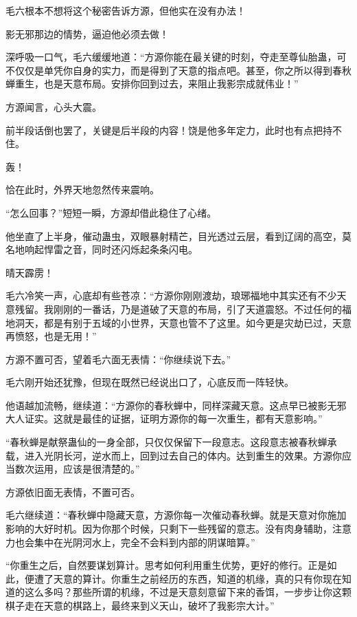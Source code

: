 
\begin{this_body}



毛六根本不想将这个秘密告诉方源，但他实在没有办法！

影无邪那边的情势，逼迫他必须去做！

深呼吸一口气，毛六缓缓地道：“方源你能在最关键的时刻，夺走至尊仙胎蛊，可不仅仅是单凭你自身的实力，而是得到了天意的指点吧。甚至，你之所以得到春秋蝉重生，也是天意布局。安排你回到过去，来阻止我影宗成就伟业！”

方源闻言，心头大震。

前半段话倒也罢了，关键是后半段的内容！饶是他多年定力，此时也有点把持不住。

轰！

恰在此时，外界天地忽然传来震响。

“怎么回事？”短短一瞬，方源却借此稳住了心绪。

他坐直了上半身，催动蛊虫，双眼暴射精芒，目光透过云层，看到辽阔的高空，莫名地响起悍雷之音，同时还闪烁起条条闪电。

晴天霹雳！

毛六冷笑一声，心底却有些苍凉：“方源你刚刚渡劫，琅琊福地中其实还有不少天意残留。我刚刚的一番话，乃是道破了天意的布局，引了天道震怒。不过任何的福地洞天，都是有别于五域的小世界，天意也管不了这里。如今更是灾劫已过，天意再愤怒，也是无用！”

方源不置可否，望着毛六面无表情：“你继续说下去。”

毛六刚开始还犹豫，但现在既然已经说出口了，心底反而一阵轻快。

他语越加流畅，继续道：“方源你的春秋蝉中，同样深藏天意。这点早已被影无邪大人证实。这就是最佳的证据，证明方源你的每一次重生，都有天意影响。”

“春秋蝉是献祭蛊仙的一身全部，只仅仅保留下一段意志。这段意志被春秋蝉承载，进入光阴长河，逆水而上，回到过去自己的体内。达到重生的效果。方源你应当数次运用，应该是很清楚的。”

方源依旧面无表情，不置可否。

毛六继续道：“春秋蝉中隐藏天意，方源你每一次催动春秋蝉。就是天意对你施加影响的大好时机。因为你那个时候，只剩下一些残留的意志。没有肉身辅助，注意力也会集中在光阴河水上，完全不会料到内部的阴谋暗算。”

“你重生之后，自然要谋划算计。思考如何利用重生优势，更好的修行。正是如此，便遭了天意的算计。你重生之前经历的东西，知道的机缘，真的只有你现在知道的这么多吗？那些所谓的机缘，不过是天意刻意留下来的香饵，一步步让你这颗棋子走在天意的棋路上，最终来到义天山，破坏了我影宗大计。”


\end{this_body}

